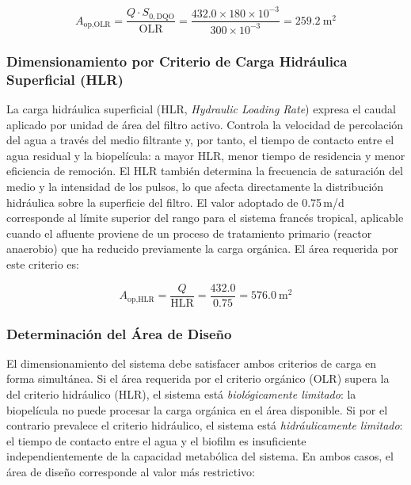 \documentclass[12pt,a4paper]{article}
\newcommand{\captionequation}[1]{}
\begin{document}
\begin{equation}
A_\text{op,OLR} = \frac{Q \cdot S_{0,\text{DQO}}}{\text{OLR}} = \frac{432.0 \times 180 \times 10^{-3}}{300 \times 10^{-3}} = 259.2\ \text{m}^2
\end{equation}
\captionequation{Área del filtro activo por criterio de carga orgánica superficial (OLR) -- HAFV}

\subsubsection*{Dimensionamiento por Criterio de Carga Hidráulica Superficial (HLR)}

La carga hidráulica superficial (HLR, \textit{Hydraulic Loading Rate}) expresa el caudal aplicado por unidad de área del filtro activo. Controla la velocidad de percolación del agua a través del medio filtrante y, por tanto, el tiempo de contacto entre el agua residual y la biopelícula: a mayor HLR, menor tiempo de residencia y menor eficiencia de remoción. El HLR también determina la frecuencia de saturación del medio y la intensidad de los pulsos, lo que afecta directamente la distribución hidráulica sobre la superficie del filtro. El valor adoptado de 0.75\,m/d corresponde al límite superior del rango para el sistema francés tropical, aplicable cuando el afluente proviene de un proceso de tratamiento primario (reactor anaerobio) que ha reducido previamente la carga orgánica. El área requerida por este criterio es:

\begin{equation}
A_\text{op,HLR} = \frac{Q}{\text{HLR}} = \frac{432.0}{0.75} = 576.0\ \text{m}^2
\end{equation}
\captionequation{Área del filtro activo por criterio de carga hidráulica superficial (HLR) -- HAFV}

\subsubsection*{Determinación del Área de Diseño}

El dimensionamiento del sistema debe satisfacer ambos criterios de carga en forma simultánea. Si el área requerida por el criterio orgánico (OLR) supera la del criterio hidráulico (HLR), el sistema está \textit{biológicamente limitado}: la biopelícula no puede procesar la carga orgánica en el área disponible. Si por el contrario prevalece el criterio hidráulico, el sistema está \textit{hidráulicamente limitado}: el tiempo de contacto entre el agua y el biofilm es insuficiente independientemente de la capacidad metabólica del sistema. En ambos casos, el área de diseño corresponde al valor más restrictivo:
\end{document}
